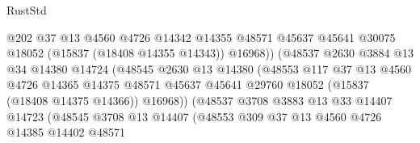 \begin{lexlean}{RustStd}
\begin{coremodule}
{\begin{coremodule}
{{{{{{{{{{{{{{{{{{{{{{{{{{{{{{{{{{{{{{{{{{{{{{{{{{{{{{{{{{{{                                    @202
                                    @37
                                    @13
                                    @4560
                                    @4726
                                    @14342
                                    @14355
                                    @48571
                                    @45637
                                    @45641
                                    @30075
                                    @18052
                                    (@15837 (@18408 @14355 @14343))
                                    @16968))
                                (@48537
                                  @2630
                                  @3884
                                  @13
                                  @34
                                  @14380
                                  @14724
                                  (@48545
                                    @2630
                                    @13
                                    @14380
                                    (@48553
                                      @117
                                      @37
                                      @13
                                      @4560
                                      @4726
                                      @14365
                                      @14375
                                      @48571
                                      @45637
                                      @45641
                                      @29760
                                      @18052
                                      (@15837 (@18408 @14375 @14366))
                                      @16968))
                                  (@48537
                                    @3708
                                    @3883
                                    @13
                                    @33
                                    @14407
                                    @14723
                                    (@48545
                                      @3708
                                      @13
                                      @14407
                                      (@48553
                                        @309
                                        @37
                                        @13
                                        @4560
                                        @4726
                                        @14385
                                        @14402
                                        @48571
}}}}}}}}}}}}}}}}}}}}}}}}}}}}}}}}}}}}}}}}}}}}}}}}}}}}}}}}}}}}
\end{coremodule}}
\end{coremodule}
\end{lexlean}

